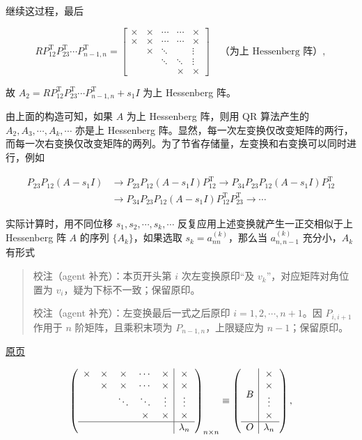 \documentclass[
  10pt,
  fontset=fandol]{ctexart}
\begin{document}
继续这过程，最后

\[
RP_{12}^{\mathrm T}P_{23}^{\mathrm T}\cdots P_{n-1,n}^{\mathrm T}
=\begin{bmatrix}
\times&\times&\cdots&\cdots&\times\\
\times&\times&\cdots&\cdots&\times\\
&\times&\ddots&&\vdots\\
&&\ddots&\ddots&\vdots\\
&&&\times&\times
\end{bmatrix}\quad\text{（为上 Hessenberg 阵）},
\]

故 \(A_2=RP_{12}^{\mathrm T}P_{23}^{\mathrm T}\cdots P_{n-1,n}^{\mathrm T}+s_1I\) 为上 Hessenberg 阵。

由上面的构造可知，如果 \(A\) 为上 Hessenberg 阵，则用 QR 算法产生的 \(A_2,A_3,\cdots,A_k,\cdots\) 亦是上 Hessenberg 阵。显然，每一次左变换仅改变矩阵的两行，而每一次右变换仅改变矩阵的两列。为了节省存储量，左变换和右变换可以同时进行，例如

\[
\begin{aligned}
P_{23}P_{12}(A-s_1I)&\to P_{23}P_{12}(A-s_1I)P_{12}^{\mathrm T}
\to P_{34}P_{23}P_{12}(A-s_1I)P_{12}^{\mathrm T}\\
&\to P_{34}P_{23}P_{12}(A-s_1I)P_{12}^{\mathrm T}P_{23}^{\mathrm T}\to\cdots
\end{aligned}
\]

实际计算时，用不同位移 \(s_1,s_2,\cdots,s_k,\cdots\) 反复应用上述变换就产生一正交相似于上 Hessenberg 阵 \(A\) 的序列 \(\{A_k\}\)，如果选取 \(s_k=a_{nn}^{(k)}\)，那么当 \(a_{n,n-1}^{(k)}\) 充分小，\(A_k\) 有形式

\begin{quote}
校注（agent 补充）：本页开头第 \(i\) 次左变换原印``及 \(v_k\)''，对应矩阵对角位置为 \(v_i\)，疑为下标不一致；保留原印。

校注（agent 补充）：左变换最后一式之后原印 \(i=1,2,\cdots,n+1\)。因 \(P_{i,i+1}\) 作用于 \(n\) 阶矩阵，且乘积末项为 \(P_{n-1,n}\)，上限疑应为 \(n-1\)；保留原印。
\end{quote}

\href{../../source-images/pdf-258.jpeg}{原页}

\[
\left(\begin{array}{ccccc|c}
\times&\times&\times&\cdots&\times&\times\\
&\times&\times&\cdots&\times&\times\\
&&\ddots&\ddots&\vdots&\vdots\\
&&&\times&\times&\times\\\hline
&&&&&\lambda_n
\end{array}\right)_{n\times n}
\equiv\left(\begin{array}{c|c}
B&\begin{matrix}\times\\\times\\\vdots\\\times\end{matrix}\\\hline
O&\lambda_n
\end{array}\right),
\]
\end{document}
